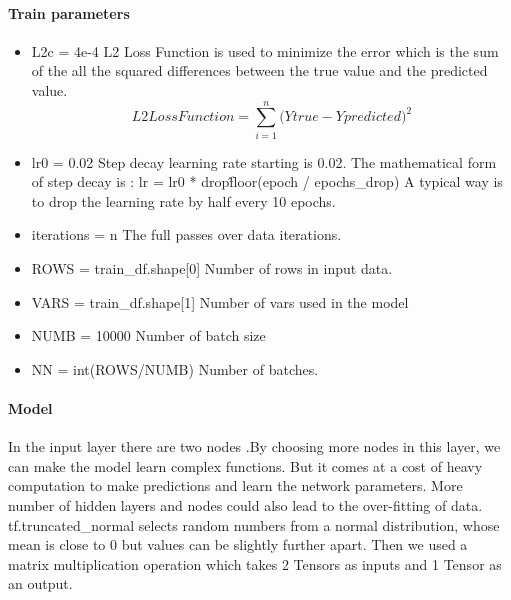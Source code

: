 \documentclass[sigconf, nonacm]{acmart}
\begin{document}
\paragraph{Train parameters}
\begin{itemize}
	\item L2c = 4e-4 \newline
	      L2 Loss Function is used to minimize the error which is the sum of the all the squared differences between the true value and the predicted value.\newline
	      \[L2LossFunction=\sum_{i=1}^{n}{(Ytrue-Ypredicted})^2\]
	      	      	      	      
	\item lr0 = 0.02 \newline
	      Step decay learning rate starting is 0.02. The mathematical form of step decay is : lr = lr0 * drop\^floor(epoch / epochs\_drop) A typical way is to drop the learning rate by half every 10 epochs.
	      	      	      	      
	\item iterations = n \newline
	      The full passes over data iterations.
	      	      	      	      
	\item ROWS = train\_df.shape[0]  \newline    
	      Number of rows in input data.
	      	      	      	      
	\item VARS = train\_df.shape[1] \newline     
	      Number of vars used in the model
	\item NUMB = 10000 \newline
	      Number of batch size
	\item NN = int(ROWS/NUMB)  \newline         
	      Number of batches.
	      	      	      	      
\end{itemize}

\paragraph{Model}
In the input layer there are two nodes .By choosing more nodes in this layer, we can make the model learn complex functions. But it comes at a cost of heavy computation to make predictions and learn the network parameters. More number of hidden layers and nodes could also lead to the over-fitting of data.
tf.truncated\_normal selects random numbers from a normal distribution, whose mean is close to 0 but values can be slightly further apart. Then we used a matrix multiplication operation which takes 2 Tensors as inputs and 1 Tensor as an output.
\end{document}
